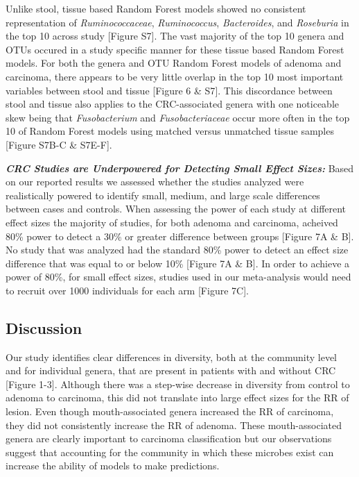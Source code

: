 \documentclass[12pt,]{article}
\begin{document}
Unlike stool, tissue based Random Forest models showed no consistent
representation of \emph{Ruminococcaceae}, \emph{Ruminococcus},
\emph{Bacteroides}, and \emph{Roseburia} in the top 10 across study
{[}Figure S7{]}. The vast majority of the top 10 genera and OTUs occured
in a study specific manner for these tissue based Random Forest models.
For both the genera and OTU Random Forest models of adenoma and
carcinoma, there appears to be very little overlap in the top 10 most
important variables between stool and tissue {[}Figure 6 \& S7{]}. This
discordance between stool and tissue also applies to the CRC-associated
genera with one noticeable skew being that \emph{Fusobacterium} and
\emph{Fusobacteriaceae} occur more often in the top 10 of Random Forest
models using matched versus unmatched tissue samples {[}Figure S7B-C \&
S7E-F{]}.

\textbf{\emph{CRC Studies are Underpowered for Detecting Small Effect
Sizes:}} Based on our reported results we assessed whether the studies
analyzed were realistically powered to identify small, medium, and large
scale differences between cases and controls. When assessing the power
of each study at different effect sizes the majority of studies, for
both adenoma and carcinoma, acheived 80\% power to detect a 30\% or
greater difference between groups {[}Figure 7A \& B{]}. No study that
was analyzed had the standard 80\% power to detect an effect size
difference that was equal to or below 10\% {[}Figure 7A \& B{]}. In
order to achieve a power of 80\%, for small effect sizes, studies used
in our meta-analysis would need to recruit over 1000 individuals for
each arm {[}Figure 7C{]}.

\newpage

\subsection{Discussion}\label{discussion}

Our study identifies clear differences in diversity, both at the
community level and for individual genera, that are present in patients
with and without CRC {[}Figure 1-3{]}. Although there was a step-wise
decrease in diversity from control to adenoma to carcinoma, this did not
translate into large effect sizes for the RR of lesion. Even though
mouth-associated genera increased the RR of carcinoma, they did not
consistently increase the RR of adenoma. These mouth-associated genera
are clearly important to carcinoma classification but our observations
suggest that accounting for the community in which these microbes exist
can increase the ability of models to make predictions.
\end{document}
